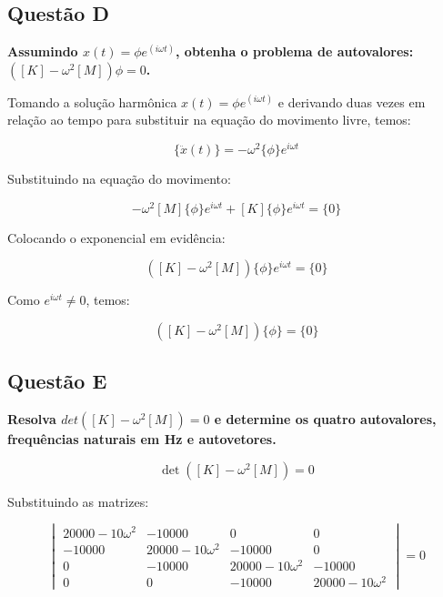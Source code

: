 \documentclass[a4paper, 12pt]{article}
\begin{document}
\subsection{Questão D}

\textbf{Assumindo ${x(t)} = {\phi}e^{(i\omega t)}$, obtenha o problema de autovalores: $([K] - \omega^2[M]){\phi} = {0}$.}

Tomando a solução harmônica ${x(t)} = {\phi}e^{(i\omega t)}$ e derivando duas vezes em relação ao tempo para substituir na equação do movimento livre, temos:

\begin{equation}
\{\ddot{x}(t)\} = -\omega^2 \{\phi\} e^{i\omega t}
\label{eq:aceleracao_harmonica}
\end{equation}

Substituindo na equação do movimento:

\begin{equation}
-\omega^2 [M]\{\phi\} e^{i\omega t}
+ [K]\{\phi\} e^{i\omega t} = \{0\}
\label{eq:substituicao_movimento}
\end{equation}

Colocando o exponencial em evidência:

\begin{equation}
\left([K] - \omega^2[M]\right)
\{\phi\} e^{i\omega t} = \{0\}
\label{eq:fatoracao_movimento}
\end{equation}

Como $e^{i\omega t} \neq 0$, temos:

\begin{equation}
\left([K] - \omega^2[M]\right)\{\phi\} = \{0\}
\label{eq:problema_autovalores}
\end{equation}


\subsection{Questão E}

\textbf{Resolva $det([K] - \omega^2[M]) = 0$ e determine os quatro autovalores, frequências naturais em Hz e 
autovetores.}

\begin{equation}
    \det\left([K] - \omega^2[M]\right) = 0
\end{equation}

Substituindo as matrizes:

\begin{equation}
\begin{vmatrix}
20000 - 10\omega^2 & -10000 & 0 & 0 \\
-10000 & 20000 - 10\omega^2 & -10000 & 0 \\
0 & -10000 & 20000 - 10\omega^2 & -10000 \\
0 & 0 & -10000 & 20000 - 10\omega^2
\end{vmatrix}
= 0
\end{equation}
\end{document}

